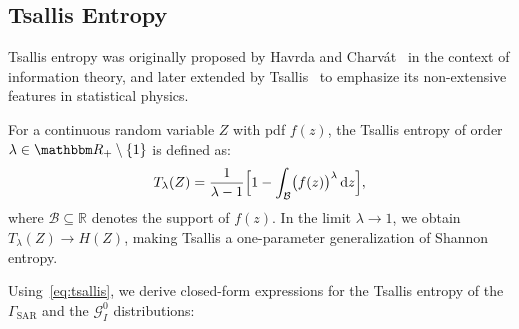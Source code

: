 \documentclass[
  lettersize  journal,
]{IEEEtran}%
\begin{document}
\subsection{Tsallis Entropy}\label{tsallis-entropy}

Tsallis entropy was originally proposed by Havrda and
Charvát~ in the context of
information theory, and later extended by
Tsallis~ to emphasize its
non-extensive features in statistical physics.

For a continuous random variable \(Z\) with pdf \(f(z)\), the Tsallis
entropy of order \(\lambda \in \mathbbm R_+ \setminus \{1\}\) is defined
as: \begin{equation}
\label{eq:tsallis}
T_\lambda(Z) = \frac{1}{\lambda - 1} \Bigl[ 1 - \int_{\mathcal{B}} \bigl(f(z)\bigr)^{\lambda} \,\mathrm{d}z \Bigr],
\end{equation} where \(\mathcal{B} \subseteq \mathbb{R}\) denotes the
support of \(f(z)\). In the limit \(\lambda \to 1\), we obtain
\(T_\lambda(Z) \to H(Z)\), making Tsallis a one-parameter generalization
of Shannon entropy.

Using~\eqref{eq:tsallis}, we derive closed-form expressions for the
Tsallis entropy of the \(\Gamma_{\mathrm{SAR}}\) and the
\(\mathcal{G}^0_I\) distributions:
\end{document}
